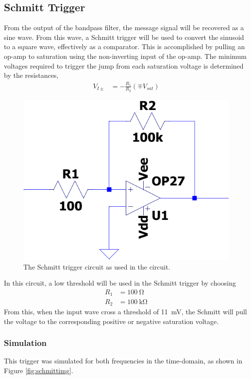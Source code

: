\documentclass[11pt,letter,notitlepage]{article}
\begin{document}
	\subsection{Schmitt Trigger}
	From the output of the bandpass filter, the message signal will be recovered as a sine wave. From this wave, a Schmitt trigger will be used to convert the sinusoid to a square wave, effectively as a comparator. This is accomplished by pulling an op-amp to saturation using the non-inverting input of the op-amp. The minimum voltages required to trigger the jump from each saturation voltage is determined by the resistances, \begin{align*}
		V_{I\pm} & = -\frac{R_1}{R_2} \left( \mp V_{sat}\right)
	\end{align*}
	
	\begin{figure}[h]
		\centering
		\includegraphics[width=0.3\linewidth]{schmitt/schmittckt-crop}
		\caption{The Schmitt trigger circuit as used in the circuit.}
		\label{fig:schmittckt-crop}
	\end{figure}

	In this circuit, a low threshold will be used in the Schmitt trigger by choosing \begin{align*}
		R_1 & = \SI{100}{\ohm} \\
		R_2 & = \SI{100}{\kohm}
	\end{align*}
	From this, when the input wave cross a threshold of \SI{11}{\mV}, the Schmitt will pull the voltage to the corresponding positive or negative saturation voltage.
	\subsubsection{Simulation}
	This trigger was simulated for both frequencies in the time-domain, as shown in Figure \ref{fig:schmittimg}.
\end{document}
